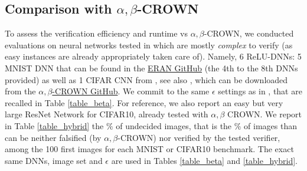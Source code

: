 






\subsection{Comparison with $\alpha,\beta$-CROWN}

To assess the verification efficiency and runtime vs $\alpha,\beta$-CROWN, we 
conducted evaluations  on neural networks tested in \cite{CROWN} which are mostly {\em complex} to verify (as easy instances are already appropriately taken care of). Namely, 6 ReLU-DNNs: 5 MNIST DNN that can be found in the \href{https://github.com/eth-sri/eran}{ERAN GitHub} 
(the 4th to the 8th DNNs provided) as well as 1 CIFAR CNN from 
\cite{AdversarialTrainingAndProvableDefenses}, see also \cite{SDPFI}, 
which can be downloaded from the \href{https://github.com/Verified-Intelligence/alpha-beta-CROWN}{$\alpha,\beta$-CROWN GitHub}. 
We commit to the same $\epsilon$ settings as in \cite{CROWN}, that are recalled in Table \ref{table_beta}. 
For reference, we also report an easy but very large ResNet Network for CIFAR10, already tested with $\alpha,\beta$ CROWN. 
We report in Table \ref{table_hybrid} the $\%$ of undecided images, that is the $\%$ of images than can be neither falsified (by $\alpha,\beta$-CROWN) nor verified by the tested verifier, among the 100 first images for each MNIST or CIFAR10 benchmark. 
The exact same DNNs, image set and $\epsilon$ are used in Tables \ref{table_beta} and \ref{table_hybrid}.


